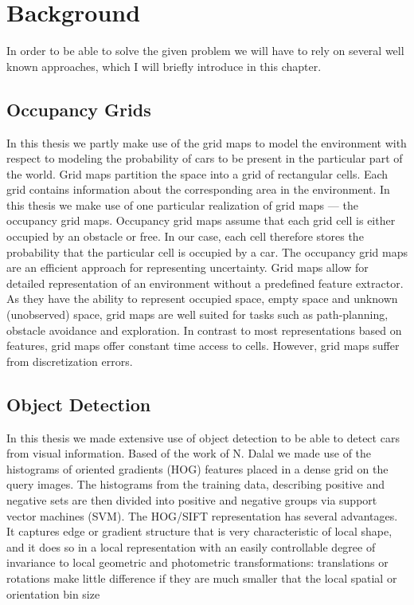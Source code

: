 \chapter{Background} %
\label{cha:background}
In order to be able to solve the given problem we will have to rely on several
well known approaches, which I will briefly introduce in this chapter.
\section{Occupancy Grids}
\label{sec:occupancy_grids}
In this thesis we partly make use of the grid maps to model the environment with
respect to modeling the probability of cars to be present in the particular part
of the world. Grid maps partition the space into a grid of rectangular cells.
Each grid contains information about the corresponding area in the environment.
In this thesis we make use of one particular realization of grid maps --- the
occupancy grid maps.
Occupancy grid maps assume that each grid cell is either occupied by an obstacle
or free. In our case, each cell therefore stores the probability that the particular
cell is occupied by a car.
The occupancy grid maps are an efficient approach for representing uncertainty.
Grid maps allow for detailed representation of an environment without a
predefined feature extractor. As they have the ability to represent occupied
space, empty space and unknown (unobserved) space, grid maps are well suited for
tasks such as path-planning, obstacle avoidance and exploration. In contrast to
most representations based on features, grid maps offer constant time access to
cells. However, grid maps suffer from discretization errors.

\section{Object Detection}
\label{sec:object_detection}
In this thesis we made extensive use of object detection to be able to detect
cars from visual information. Based of the work of N. Dalal we made use of the
histograms of oriented gradients (HOG) features placed in a dense grid on the
query images. The histograms from the training data, describing positive and
negative sets are then divided into positive and negative groups via support
vector machines (SVM).
The HOG/SIFT representation has several advantages. It
captures edge or gradient structure that is very characteristic
of local shape, and it does so in a local representation with
an easily controllable degree of invariance to local geometric
and photometric transformations: translations or rotations
make little difference if they are much smaller that the local
spatial or orientation bin size


